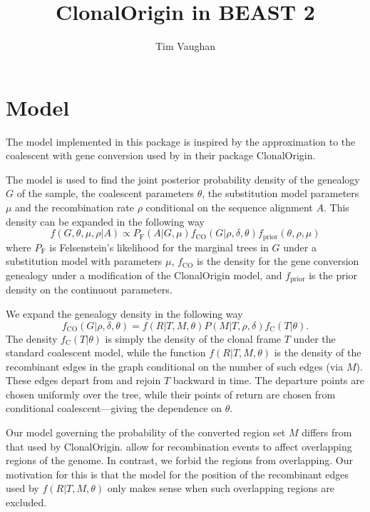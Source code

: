 \documentclass[a4paper,10pt]{article}
\title{ClonalOrigin in BEAST 2}
\author{Tim Vaughan}
\begin{document}
\maketitle{}

\section{Model}

The model implemented in this package is inspired by the approximation
to the coalescent with gene conversion \citep{Wiuf2000a} used by
\cite{Didelot2010} in their package ClonalOrigin. 

The model is used to find the joint posterior probability density of the
genealogy $G$ of the sample, the coalescent parameters $\theta$, the
substitution model parameters $\mu$ and the recombination rate $\rho$
conditional on the sequence alignment $A$.  This density can be
expanded in the following way
\begin{equation}
f(G,\theta,\mu,\rho|A) \propto P_{\mathrm{F}}(A|G,\mu)f_{\mathrm{CO}}(G|\rho,\delta,\theta)f_{\mathrm{prior}}(\theta,\rho,\mu)
\end{equation}
where $P_{\mathrm{F}}$ is Felsenstein's likelihood for the marginal
trees in $G$ under a substitution model with parameters $\mu$,
$f_{\mathrm{CO}}$ is the density for the gene conversion genealogy
under a modification of the ClonalOrigin model, and
$f_{\mathrm{prior}}$ is the prior density on the continuout
parameters.

We expand the genealogy density in the following way
\begin{equation}
f_{\mathrm{CO}}(G|\rho,\delta,\theta)=f(R|T,M,\theta)P(M|T,\rho,\delta)f_{\mathrm{C}}(T|\theta).
\end{equation}
The density $f_{\mathrm{C}}(T|\theta)$ is simply the density of the
clonal frame $T$ under the standard coalescent model, while the function
$f(R|T,M,\theta)$ is the density of the recombinant edges in the
graph conditional on the number of such edges (via $M$).  These edges
depart from and rejoin $T$ backward in time.  The departure points are
chosen uniformly over the tree, while their points of return are
chosen from conditional coalescent---giving the dependence on
$\theta$.

Our model governing the probability of the converted region set $M$
differs from that used by ClonalOrigin. \cite{Didelot2010} allow for
recombination events to affect overlapping regions of the genome.  In
contrast, we forbid the regions from overlapping. Our motivation for
this is that the model for the position of the recombinant edges used
by $f(R|T,M,\theta)$ only makes sense when such overlapping regions
are excluded.
\end{document}

